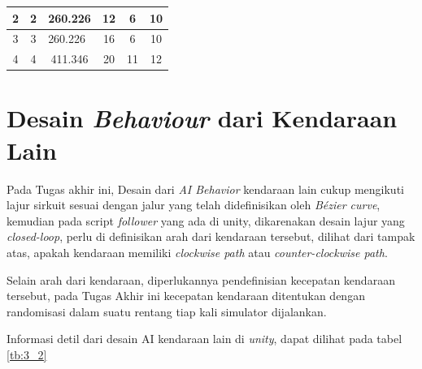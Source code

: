 \begin{table}[]
\begin{tabular}{|c|c|c|c|c|c|}
2                    & 2                                                                              & 260.226                                                                 & 12                                                                            & 6                                           & 10                                          \\ \hline
3                    & 3                                                                              & \multicolumn{1}{l|}{260.226}                                            & 16                                                                            & 6                                           & 10                                          \\ \hline
4                    & 4                                                                              & 411.346                                                                 & 20                                                                            & 11                                          & 12                                          \\ \hline
\end{tabular}
\end{table}
    
\section{Desain \textit{Behaviour} dari Kendaraan Lain}
\vspace{1ex}

    \par Pada Tugas akhir ini, Desain dari \textit{AI Behavior} kendaraan lain cukup mengikuti lajur sirkuit sesuai dengan jalur yang telah didefinisikan oleh \textit{Bézier curve}, kemudian pada script \textit{follower} yang ada di unity, dikarenakan desain lajur yang \textit{closed-loop}, perlu di definisikan arah dari kendaraan tersebut, dilihat dari tampak atas, apakah kendaraan memiliki \textit{clockwise path} atau \textit{counter-clockwise path}.
    \par Selain arah dari kendaraan, diperlukannya pendefinisian kecepatan kendaraan tersebut, pada Tugas Akhir ini kecepatan kendaraan ditentukan dengan randomisasi dalam suatu rentang tiap kali simulator dijalankan.
    \par Informasi detil dari desain AI kendaraan lain di \textit{unity}, dapat dilihat pada tabel \ref{tb:3_2}

